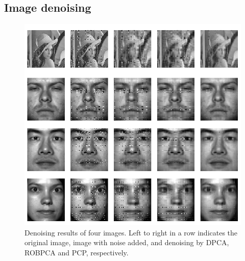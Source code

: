 \subsection*{\sffamily \large Image denoising}

\begin{figure}[t]
\centering
\includegraphics[width=.8\textwidth]{all_denoise}
\caption{Denoising results of four images. Left to right in a row indicates the original image, image with noise added, and denoising by DPCA, ROBPCA and PCP, respectively.}
\label{fig:figDenoise}
\end{figure}
